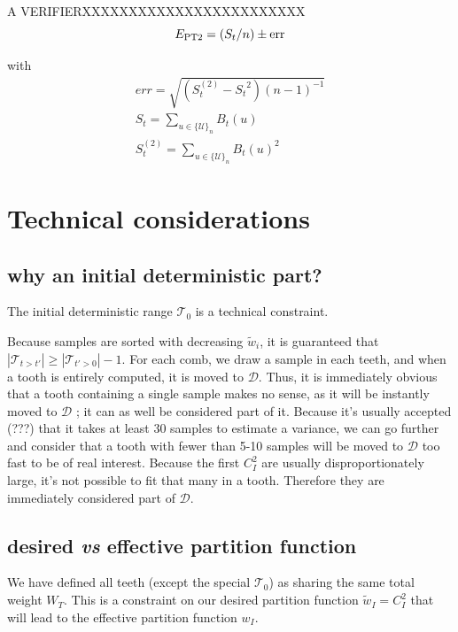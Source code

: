 \documentclass[./thesis.tex]{subfiles}
\begin{document}
\alert{A VERIFIERXXXXXXXXXXXXXXXXXXXXXXXX}
\begin{equation}
E_\text{PT2} = (S_{t} / n) \pm \text{err}
\end{equation}

with
\begin{align}
err = \sqrt{(S_{t}^{(2)} - {S_{t}}^2) (n-1)^{-1} } \\
S_{t} = \sum_{u \in \{\mathcal{U}\}_n} B_{t}(u) \\
S^{(2)}_{t} = \sum_{u \in \{\mathcal{U}\}_n} B_{t}(u)^2
\end{align}




\section{Technical considerations}


\subsection*{why an initial deterministic part?}

The initial deterministic range $\mathcal{T}_0$ is a technical constraint.

Because samples are sorted with decreasing $\tilde w_i$, it is guaranteed that $|\mathcal{T}_{t>t'}| \geq |\mathcal{T}_{t'>0}|-1$.
For each comb, we draw a sample in each teeth, and when a tooth is entirely computed, it is moved to $\mathcal{D}$. Thus, it is immediately obvious that a tooth containing a single sample makes no sense, as it will be instantly moved to $\mathcal{D}$ ; it can as well be considered part of it. Because it's usually accepted (???) that it takes at least 30 samples to estimate a variance, we can go further and consider that a tooth with fewer than 5-10 samples will be moved to $\mathcal{D}$ too fast to be of real interest. Because the first $C_I^2$ are usually disproportionately large, it's not possible to fit that many in a tooth. Therefore they are immediately considered part of $\mathcal{D}$.

\subsection*{desired \textit{vs} effective partition function}

We have defined all teeth (except the special $\mathcal{T}_0$) as sharing the same total weight $W_T$. This is a constraint on our desired partition function $\tilde w_I = C_I^2$ that will lead to the effective partition function $w_I$.
\end{document}
